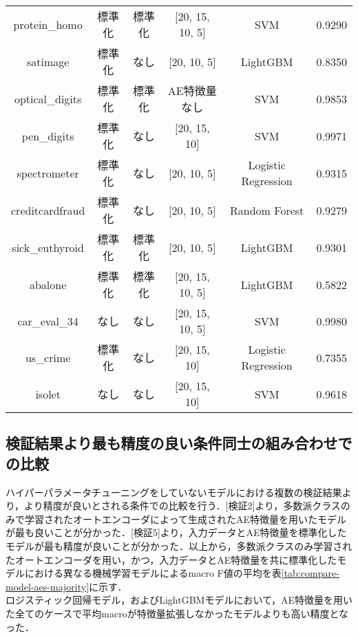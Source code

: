 \begin{table}[htbp]
\begin{tabular}{cccccc}
        protein\_homo & 標準化 & 標準化 & [20, 15, 10, 5] & SVM & 0.9290\\
        satimage & 標準化 & なし & [20, 10, 5] & LightGBM & 0.8350\\
        optical\_digits & 標準化 & 標準化 & AE特徴量なし & SVM & 0.9853\\
        pen\_digits & 標準化 & なし & [20, 15, 10] & SVM & 0.9971\\
        spectrometer & 標準化 & なし & [20, 10, 5] & Logistic Regression & 0.9315\\
        creditcardfraud & 標準化 & なし & [20, 10, 5] & Random Forest & 0.9279\\
        sick\_euthyroid & 標準化 & 標準化 & [20, 10, 5] & LightGBM & 0.9301\\
        abalone & 標準化 & 標準化 & [20, 15, 10, 5] & LightGBM & 0.5822\\
        car\_eval\_34 & なし & なし & [20, 15, 10, 5] & SVM & 0.9980\\
        us\_crime & 標準化 & なし & [20, 15, 10] & Logistic Regression & 0.7355\\
        isolet & なし & なし & [20, 15, 10] & SVM & 0.9618\\
        \hline

    \end{tabular}
\end{table}

\subsection{検証結果より最も精度の良い条件同士の組み合わせでの比較}
ハイパーパラメータチューニングをしていないモデルにおける複数の検証結果より，より精度が良いとされる条件での比較を行う．[検証2]より，多数派クラスのみで学習されたオートエンコーダによって生成されたAE特徴量を用いたモデルが最も良いことが分かった．[検証5]より，入力データとAE特徴量を標準化したモデルが最も精度が良いことが分かった．以上から，多数派クラスのみ学習されたオートエンコーダを用い，かつ，入力データとAE特徴量を共に標準化したモデルにおける異なる機械学習モデルによるmacro F値の平均を表\ref{tab:compare-model-aes-majority}に示す．\\
ロジスティック回帰モデル，およびLightGBMモデルにおいて，AE特徴量を用いた全てのケースで平均macroが特徴量拡張しなかったモデルよりも高い精度となった．

